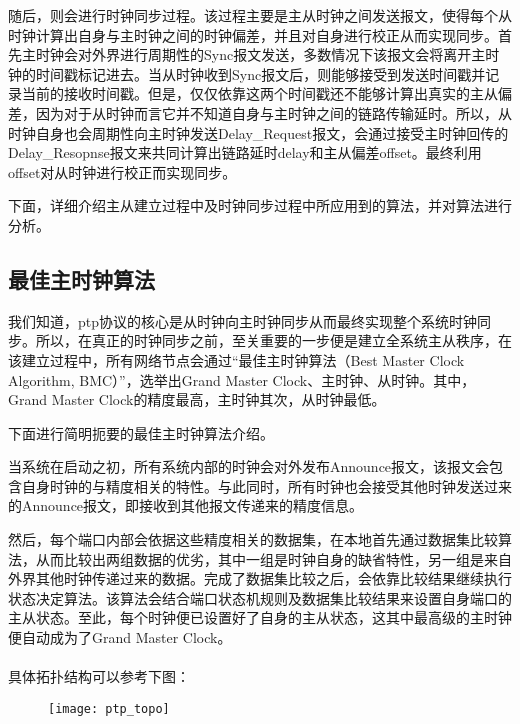 随后，则会进行时钟同步过程。该过程主要是主从时钟之间发送报文，使得每个从时钟计算出自身与主时钟之间的时钟偏差，并且对自身进行校正从而实现同步。首先主时钟会对外界进行周期性的Sync报文发送，多数情况下该报文会将离开主时钟的时间戳标记进去。当从时钟收到Sync报文后，则能够接受到发送时间戳并记录当前的接收时间戳。但是，仅仅依靠这两个时间戳还不能够计算出真实的主从偏差，因为对于从时钟而言它并不知道自身与主时钟之间的链路传输延时。所以，从时钟自身也会周期性向主时钟发送Delay\_Request报文，会通过接受主时钟回传的Delay\_Resopnse报文来共同计算出链路延时delay和主从偏差offset。最终利用offset对从时钟进行校正而实现同步。

下面，详细介绍主从建立过程中及时钟同步过程中所应用到的算法，并对算法进行分析。

\subsection{最佳主时钟算法}
\label{sec:1588_theory_bmc}
我们知道，ptp协议的核心是从时钟向主时钟同步从而最终实现整个系统时钟同步。所以，在真正的时钟同步之前，至关重要的一步便是建立全系统主从秩序，在该建立过程中，所有网络节点会通过“最佳主时钟算法（Best Master Clock Algorithm, BMC）”，选举出Grand Master Clock、主时钟、从时钟。其中，Grand Master Clock的精度最高，主时钟其次，从时钟最低。

下面进行简明扼要的最佳主时钟算法介绍。

当系统在启动之初，所有系统内部的时钟会对外发布Announce报文，该报文会包含自身时钟的与精度相关的特性。与此同时，所有时钟也会接受其他时钟发送过来的Announce报文，即接收到其他报文传递来的精度信息。

然后，每个端口内部会依据这些精度相关的数据集，在本地首先通过数据集比较算法，从而比较出两组数据的优劣，其中一组是时钟自身的缺省特性，另一组是来自外界其他时钟传递过来的数据。完成了数据集比较之后，会依靠比较结果继续执行状态决定算法。该算法会结合端口状态机规则及数据集比较结果来设置自身端口的主从状态。至此，每个时钟便已设置好了自身的主从状态，这其中最高级的主时钟便自动成为了Grand Master Clock。
\\
\\

具体拓扑结构可以参考下图：
\begin{figure}[!hbp]
  \centering
  \begin{minipage}[b]{0.6\textwidth}
    \captionstyle{\centering}
    \centering
    \texttt{[image: ptp\_topo]}
  \end{minipage}     
\end{figure}

